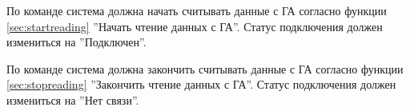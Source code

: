 
По команде система должна начать считывать данные с ГА согласно функции \ref{sec:startreading} ''Начать чтение данных с ГА''. Статус подключения должен измениться на ''Подключен''.



По команде система должна закончить считывать данные с ГА согласно функции \ref{sec:stopreading} ''Закончить чтение данных с ГА''. Статус подключения должен измениться на ''Нет связи''.


